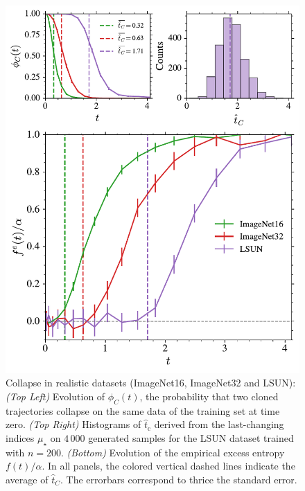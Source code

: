 \documentclass[10pt,twocolumn]{article}
\begin{document}
\begin{figure}[!t]%
\centering
\includegraphics[width=1\linewidth]{Figures/Collapse_ftalpha.pdf}
\caption{Collapse in realistic datasets (ImageNet16, ImageNet32 and LSUN): \textit{(Top Left)} Evolution of $\phi_C(t)$, the probability that two cloned trajectories collapse on the same data of the training set at time zero. \textit{(Top Right)} Histograms of $\hat{t}_\mathrm{c}$ derived from the last-changing indices $\mu_\star$ on $4\,000$ generated samples for the LSUN dataset trained with $n=200$. \textit{(Bottom)} Evolution of the empirical excess entropy $f(t)/\alpha$. In all panels, the colored vertical dashed lines indicate the average of $\hat{t}_C$. The errorbars correspond to thrice the standard error.
}
\label{fig:collapse}
\end{figure}

\end{document}
